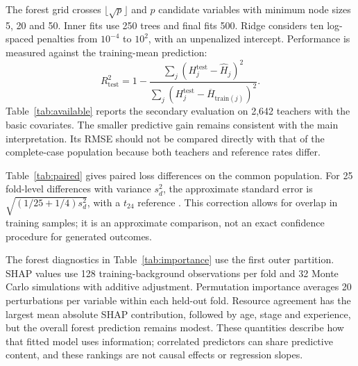 The forest grid crosses $\lfloor\sqrt p\rfloor$ and $p$ candidate variables with minimum node sizes 5, 20 and 50. Inner fits use 250 trees and final fits 500. Ridge considers ten log-spaced penalties from $10^{-4}$ to $10^2$, with an unpenalized intercept. Performance is measured against the training-mean prediction:
\[
R^2_{\mathrm{test}}=1-\frac{\sum_j(H_j^{\mathrm{test}}-\widehat H_j)^2}
{\sum_j(H_j^{\mathrm{test}}-\overline H_{\mathrm{train}(j)})^2}.
\]
Table~\ref{tab:available} reports the secondary evaluation on 2,642 teachers with the basic covariates. The smaller predictive gain remains consistent with the main interpretation. Its RMSE should not be compared directly with that of the complete-case population because both teachers and reference rates differ.

Table~\ref{tab:paired} gives paired loss differences on the common population. For 25 fold-level differences with variance $s_d^2$, the approximate standard error is $\sqrt{(1/25+1/4)s_d^2}$, with a $t_{24}$ reference \cite{nadeau}. This correction allows for overlap in training samples; it is an approximate comparison, not an exact confidence procedure for generated outcomes.

The forest diagnostics in Table~\ref{tab:importance} use the first outer partition. SHAP values use 128 training-background observations per fold and 32 Monte Carlo simulations with additive adjustment. Permutation importance averages 20 perturbations per variable within each held-out fold. Resource agreement has the largest mean absolute SHAP contribution, followed by age, stage and experience, but the overall forest prediction remains modest. These quantities describe how that fitted model uses information; correlated predictors can share predictive content, and these rankings are not causal effects or regression slopes.

